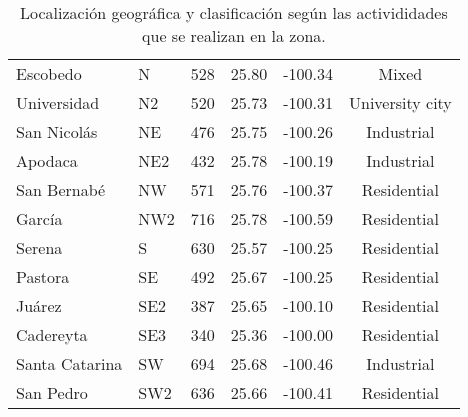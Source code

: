 \begin{table}[H]
\begin{tabular}{llcccc}
        Escobedo       & N    & 528             & 25.80    & -100.34   & Mixed           \\
        Universidad    & N2   & 520             & 25.73    & -100.31   & University city \\
        San Nicolás    & NE   & 476             & 25.75    & -100.26   & Industrial      \\
        Apodaca        & NE2  & 432             & 25.78    & -100.19   & Industrial      \\
        San Bernabé    & NW   & 571             & 25.76    & -100.37   & Residential     \\
        García         & NW2  & 716             & 25.78    & -100.59   & Residential     \\
        Serena         & S    & 630             & 25.57    & -100.25   & Residential     \\
        Pastora        & SE   & 492             & 25.67    & -100.25   & Residential     \\
        Juárez         & SE2  & 387             & 25.65    & -100.10   & Residential     \\
        Cadereyta      & SE3  & 340             & 25.36    & -100.00   & Residential     \\
        Santa Catarina & SW   & 694             & 25.68    & -100.46   & Industrial      \\
        San Pedro      & SW2  & 636             & 25.66    & -100.41   & Residential     \\ \hline
    \end{tabular}
    \caption{Localización geográfica y clasificación según las activididades que se realizan en la zona.}
    \label{table:stations_loc}
\end{table}